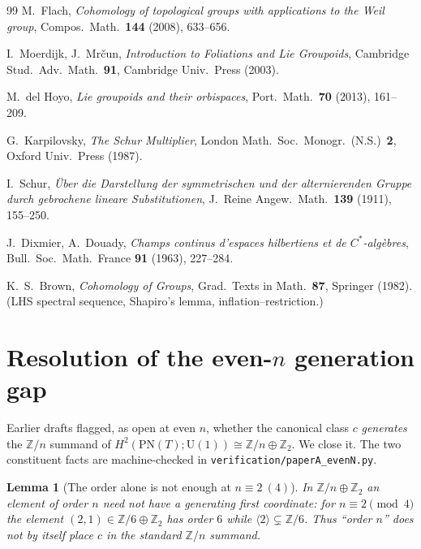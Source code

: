 \documentclass[11pt]{article}
\newtheorem{lemma}[theorem]{Lemma}
\theoremstyle{definition}
\begin{document}
\begin{thebibliography}{99}
 M.~Flach, \emph{Cohomology of topological groups with applications to the
Weil group}, Compos.\ Math.\ \textbf{144} (2008), 633--656.

 I.~Moerdijk, J.~Mr\v{c}un, \emph{Introduction to Foliations and Lie
Groupoids}, Cambridge Stud.\ Adv.\ Math.\ \textbf{91}, Cambridge Univ.\ Press (2003).

 M.~del Hoyo, \emph{Lie groupoids and their orbispaces}, Port.\ Math.\
\textbf{70} (2013), 161--209.

 G.~Karpilovsky, \emph{The Schur Multiplier}, London Math.\ Soc.\
Monogr.\ (N.S.)\ \textbf{2}, Oxford Univ.\ Press (1987).

 I.~Schur, \emph{\"Uber die Darstellung der symmetrischen und der
alternierenden Gruppe durch gebrochene lineare Substitutionen}, J.~Reine Angew.\ Math.\
\textbf{139} (1911), 155--250.

\bibitem{DixmierDouady} J.~Dixmier, A.~Douady, \emph{Champs continus d'espaces hilbertiens
et de $C^*$-alg\`ebres}, Bull.\ Soc.\ Math.\ France \textbf{91} (1963), 227--284.

\bibitem{Brown} K.~S.~Brown, \emph{Cohomology of Groups}, Grad.\ Texts in Math.\
\textbf{87}, Springer (1982). (LHS spectral sequence, Shapiro's lemma, inflation--restriction.)

\end{thebibliography}


\section{Resolution of the even-$n$ generation gap}\label{sec:evenN}
Earlier drafts flagged, as open at even $n$, whether the canonical class $c$ \emph{generates} the
$\mathbb{Z}/n$ summand of $H^{2}(\mathrm{PN}(T);\mathrm{U}(1))\cong\mathbb{Z}/n\oplus\mathbb{Z}_{2}$.
We close it. The two constituent facts are machine-checked in \texttt{verification/paperA\_evenN.py}.

\begin{lemma}[The order alone is not enough at $n\equiv2\ (4)$]
In $\mathbb{Z}/n\oplus\mathbb{Z}_{2}$ an element of order $n$ need not have a generating first
coordinate: for $n\equiv2\pmod4$ the element $(2,1)\in\mathbb{Z}/6\oplus\mathbb{Z}_{2}$ has order $6$
while $\langle2\rangle\subsetneq\mathbb{Z}/6$. Thus ``order $n$'' does not by itself place $c$ in the
standard $\mathbb{Z}/n$ summand.
\end{lemma}
\end{document}

